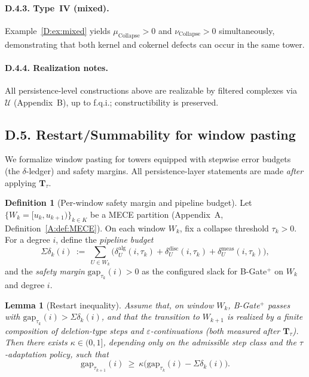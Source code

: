 \documentclass[11pt]{article}
\DeclareRobustCommand{\hyp}{\nobreakdash-}
\numberwithin{equation}{section}
\newtheorem{lemma}[theorem]{Lemma}
\theoremstyle{definition}
\newtheorem{definition}[theorem]{Definition}
\DeclareRobustCommand{\muc}{\mu_{\mathrm{Collapse}}}
\DeclareRobustCommand{\nuc}{\nu_{\mathrm{Collapse}}}
\begin{document}
\paragraph{D.4.3. Type~IV (mixed).}
Example~\ref{D:ex:mixed} yields \(\muc>0\) and \(\nuc>0\) simultaneously, demonstrating that both kernel and cokernel defects can occur in the same tower.

\paragraph{D.4.4. Realization notes.}
All persistence-level constructions above are realizable by filtered complexes via \(\mathcal{U}\) (Appendix~B), up to f.q.i.; constructibility is preserved.

\subsection*{D.5. Restart/Summability for window pasting}

We formalize window pasting for towers equipped with stepwise error budgets (the \(\delta\)-ledger) and safety margins. All persistence-layer statements are made \emph{after} applying \(\mathbf{T}_\tau\).

\begin{definition}[Per-window safety margin and pipeline budget]\label{D:def:window-budget}
Let \(\{W_k=[u_k,u_{k+1})\}_{k\in K}\) be a MECE partition (Appendix~A, Definition~\ref{A:def:MECE}). On each window \(W_k\), fix a collapse threshold \(\tau_k>0\). For a degree \(i\), define the \emph{pipeline budget}
\[
\Sigma\delta_k(i)\ :=\ \sum_{U\in W_k}\Big(\delta^{\mathrm{alg}}_{U}(i,\tau_k)+\delta^{\mathrm{disc}}_{U}(i,\tau_k)+\delta^{\mathrm{meas}}_{U}(i,\tau_k)\Big),
\]
and the \emph{safety margin} \(\mathrm{gap}_{\tau_k}(i)>0\) as the configured slack for B\hyp Gate\(^{+}\) on \(W_k\) and degree \(i\).
\end{definition}

\begin{lemma}[Restart inequality]\label{D:lem:restart}
Assume that, on window \(W_k\), B\hyp Gate\(^{+}\) passes with \(\mathrm{gap}_{\tau_k}(i)>\Sigma\delta_k(i)\), and that the transition to \(W_{k+1}\) is realized by a finite composition of \emph{deletion-type} steps and \(\varepsilon\)\hyp continuations (both measured after \(\mathbf{T}_\tau\)). Then there exists \(\kappa\in(0,1]\), depending only on the admissible step class and the \(\tau\)-adaptation policy, such that
\[
\mathrm{gap}_{\tau_{k+1}}(i)\ \ge\ \kappa\bigl(\mathrm{gap}_{\tau_k}(i)-\Sigma\delta_k(i)\bigr).
\]
\end{lemma}
\end{document}
